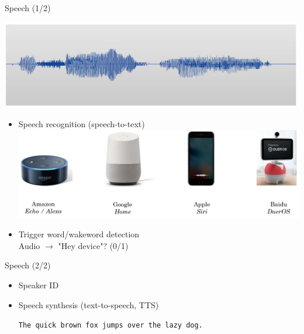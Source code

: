 \documentclass[pdf]{beamer}
\theoremstyle{mystyle}
\begin{document}
\begin{frame}{Speech (1/2)}
	\begin{center}
		\includegraphics[scale=.25]{speech-1}
	\end{center}
	\begin{itemize}
		\item Speech recognition (speech-to-text) \\
		\includegraphics[scale=.2]{smart-speakers}
		\item<2-> Trigger word/wakeword detection \\
		Audio $\longrightarrow$ "Hey device"? (0/1)
	\end{itemize}
\end{frame}

\begin{frame}{Speech (2/2)}
	\begin{itemize}
		\item Speaker ID

		\bigskip

		\item<2-> Speech synthesis (text-to-speech, TTS)
		\begin{center}
			\texttt{The quick brown fox jumps over the lazy dog.}	
		\end{center}						
	\end{itemize}
\end{frame}
\end{document}
